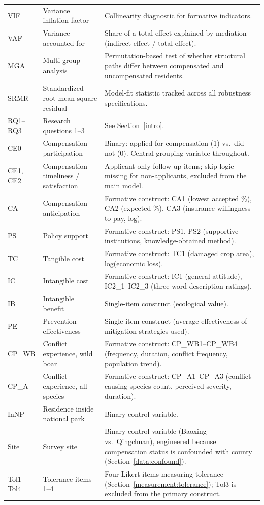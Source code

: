 \begin{longtable}{p{1.9cm}p{3.8cm}p{7.3cm}}
VIF   & Variance inflation factor & Collinearity diagnostic for formative indicators. \\
VAF   & Variance accounted for & Share of a total effect explained by mediation (indirect effect / total effect). \\
MGA   & Multi-group analysis & Permutation-based test of whether structural paths differ between compensated and uncompensated residents. \\
SRMR  & Standardized root mean square residual & Model-fit statistic tracked across all robustness specifications. \\
RQ1--RQ3 & Research questions 1--3 & See Section~\ref{intro}. \\
\hline
CE0   & Compensation participation & Binary: applied for compensation (1) vs.\ did not (0). Central grouping variable throughout. \\
CE1, CE2 & Compensation timeliness / satisfaction & Applicant-only follow-up items; skip-logic missing for non-applicants, excluded from the main model. \\
CA    & Compensation anticipation & Formative construct: CA1 (lowest accepted \%), CA2 (expected \%), CA3 (insurance willingness-to-pay, log). \\
PS    & Policy support & Formative construct: PS1, PS2 (supportive institutions, knowledge-obtained method). \\
TC    & Tangible cost & Formative construct: TC1 (damaged crop area), log(economic loss). \\
IC    & Intangible cost & Formative construct: IC1 (general attitude), IC2\_1--IC2\_3 (three-word description ratings). \\
IB    & Intangible benefit & Single-item construct (ecological value). \\
PE    & Prevention effectiveness & Single-item construct (average effectiveness of mitigation strategies used). \\
CP\_WB & Conflict experience, wild boar & Formative construct: CP\_WB1--CP\_WB4 (frequency, duration, conflict frequency, population trend). \\
CP\_A  & Conflict experience, all species & Formative construct: CP\_A1--CP\_A3 (conflict-causing species count, perceived severity, duration). \\
InNP  & Residence inside national park & Binary control variable. \\
Site  & Survey site & Binary control variable (Baoxing vs.\ Qingchuan), engineered because compensation status is confounded with county (Section~\ref{data:confound}). \\
Tol1--Tol4 & Tolerance items 1--4 & Four Likert items measuring tolerance (Section~\ref{measurement:tolerance}); Tol3 is excluded from the primary construct. \\
\hline
\end{longtable}

